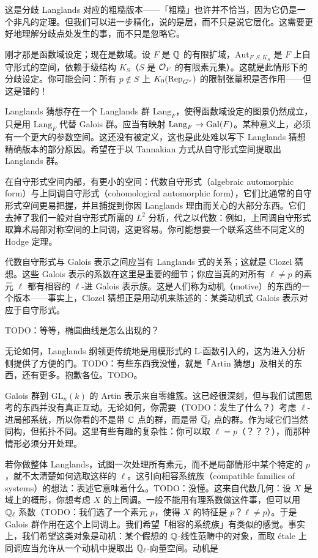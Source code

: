 这是分歧 Langlands 对应的粗糙版本——「粗糙」也许并不恰当，因为它仍是一个非凡的定理。但我们可以进一步精化，说的是层，而不只是说它层化。这需要更好地理解分歧点处发生的事，而不只是忽略它。

刚才那是函数域设定；现在是数域。设 $F$ 是 $\mathbb{Q}$ 的有限扩域，$\mathrm{Aut}_{F,S,K_S}$ 是 $F$ 上自守形式的空间，依赖于级结构 $K_S$（$S$ 是 $\mathcal{O}_F$ 的有限素元集）。这就是此情形下的分歧设定。你可能会问：所有 $p\notin S$ 上 $K_0(\operatorname{Rep}_{G^\vee})$ 的限制张量积是否作用——但这是错的！

Langlands 猜想存在一个 Langlands 群 $\mathrm{Lang}_F$，使得函数域设定的图景仍然成立，只是用 $\mathrm{Lang}_F$ 代替 Galois 群。应当有映射 $\mathrm{Lang}_F\to\operatorname{Gal}(F)$。某种意义上，必须有一个更大的参数空间。这还没有被定义，这也是此处难以写下 Langlands 猜想精确版本的部分原因。希望在于以 Tannakian 方式从自守形式空间提取出 Langlands 群。

在自守形式空间内部，有更小的空间：代数自守形式（algebraic automorphic form）与上同调自守形式（cohomological automorphic form），它们比通常的自守形式空间更易把握，并且捕捉到你因 Langlands 理由而关心的大部分东西。它们去掉了我们一般对自守形式所需的 $L^2$ 分析，代之以代数：例如，上同调自守形式取算术局部对称空间的上同调，这更容易。你可能想要一个联系这些不同定义的 Hodge 定理。

代数自守形式与 Galois 表示之间应当有 Langlands 式的关系；这就是 Clozel 猜想。这些 Galois 表示的系数在这里是重要的细节；你应当真的对所有 $\ell\neq p$ 的素元 $\ell$ 都有相容的 $\ell$-进 Galois 表示族。这是人们称为动机（motive）的东西的一个版本——事实上，Clozel 猜想正是用动机来陈述的：某类动机式 Galois 表示对应于自守形式。

TODO：等等，椭圆曲线是怎么出现的？

无论如何，Langlands 纲领更传统地是用模形式的 L-函数引入的，这为进入分析侧提供了方便的门。TODO：有些东西我没懂，就是「Artin 猜想」及相关的东西，还有更多。抱歉各位。TODO。

Galois 群到 $\mathrm{GL}_n(k)$ 的 Artin 表示来自零维簇。这已经很深刻，但与我们试图思考的东西并没有真正互动。无论如何，你需要（TODO：发生了什么？）考虑 $\ell$-进局部系统，所以你看的不是带 $\mathbb{C}$ 点的群，而是带 $\overline{\mathbb{Q}}_\ell$ 点的群。作为域它们当然同构，但拓扑不同。这里有些有趣的复杂性：你可以取 $\ell=p$（？？？），而那种情形必须分开处理。

若你做整体 Langlands，试图一次处理所有素元，而不是局部情形中某个特定的 $p$，就不太清楚如何选取这样的 $\ell$。这引向相容系统族（compatible families of systems）的想法：表述它意味着什么。TODO：没懂。这来自代数几何：设 $X$ 是域上的概形，你想考虑 $X$ 的上同调。一般不能用有理系数做这件事，但可以用 $\mathbb{Q}_\ell$ 系数（TODO：我们选了一个素元 $p$，使得 $X$ 的特征是 $p$？$\ell\neq p$）。于是 Galois 群作用在这个上同调上。我们希望「相容的系统族」有类似的感觉。事实上，我们希望这类对象是动机：某个假想的 $\mathbb{Q}$-线性范畴中的对象，而取 étale 上同调应当允许从一个动机中提取出 $\mathbb{Q}_\ell$-向量空间。动机是

